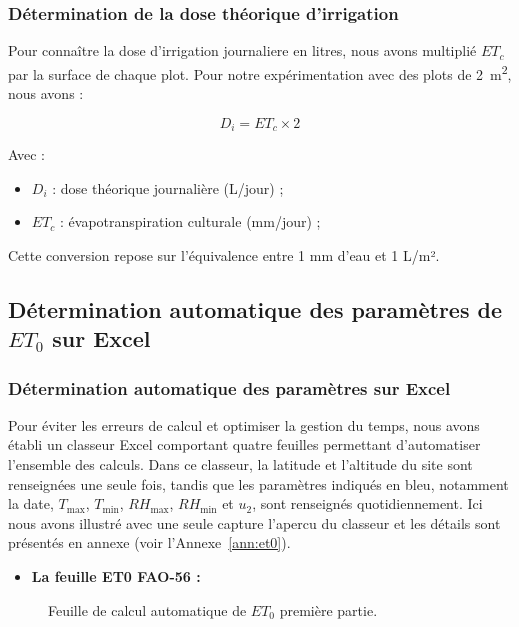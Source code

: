 \subsubsection{Détermination de la dose théorique d’irrigation}
Pour connaître la dose d'irrigation journaliere en litres, nous avons multiplié $ET_c$ par la surface de chaque plot. Pour notre expérimentation avec des plots de 2~m\textsuperscript{2}, nous avons :

\begin{equation}
    D_i = ET_c \times 2
    \label{eq:dose_irrigation}
\end{equation}

Avec :
\begin{itemize}[label=$\bullet$]
   	\item $D_i$ : dose théorique journalière (L/jour) ;

    \item $ET_c$ : évapotranspiration culturale (mm/jour) ;

\end{itemize}

Cette conversion repose sur l’équivalence entre 1 mm d’eau et 1 L/m².

\subsection{Détermination automatique des paramètres de \texorpdfstring{$ET_0$}{ET0} sur Excel}
\subsubsection{Détermination automatique des paramètres sur Excel}
Pour éviter les erreurs de calcul et optimiser la gestion du temps, nous avons établi un classeur Excel comportant quatre feuilles permettant d'automatiser l'ensemble des calculs. 
Dans ce classeur, la latitude et l'altitude du site sont renseignées une seule fois, tandis que les paramètres indiqués en bleu, notamment la date, $T_{\max}$, $T_{\min}$, $RH_{\max}$, $RH_{\min}$ et $u_2$, sont renseignés quotidiennement.
Ici nous avons illustré avec une seule capture l'apercu du classeur et les détails sont présentés en annexe (voir l’Annexe~\ref{ann:et0}).

\begin{itemize}[label=$\bullet$]
   	\item \textbf{La feuille ET0 FAO-56 :}
\end{itemize}
    
    \begin{figure}[H]
    \centering
    \caption{Feuille de calcul automatique de $ET_0$ première partie. }
    \label{fig:partie1}
\end{figure}

